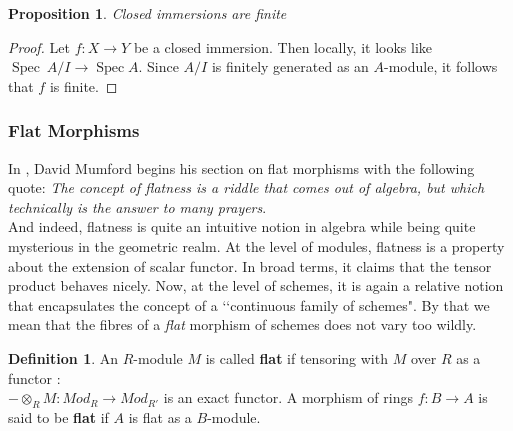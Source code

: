 \documentclass{article}
\theoremstyle{plain}
\newtheorem{proposition}[theorem]{Proposition}
\theoremstyle{definition}
\newtheorem{definition}[theorem]{Definition}
\DeclareMathOperator{\Spec}{Spec}
\begin{document}
\begin{proposition}
\label{closed_is_finite}
    Closed immersions are finite 
\end{proposition}
\begin{proof}
    Let $f:X\rightarrow Y$ be a closed immersion. 
    Then locally, it looks like $\Spec\: A/I \rightarrow \Spec A$. 
    Since $A/I$ is finitely generated as an $A$-module, it follows that $f$ is finite.
\end{proof}



\subsubsection{Flat Morphisms}


In \cite{Red_Book}, David Mumford begins his section on flat morphisms with the following quote:
\textit{The concept of flatness is a riddle that comes out of algebra, but which
technically is the answer to many prayers}.\\
And indeed, flatness is quite an intuitive notion in algebra while being quite mysterious in the geometric realm.
At the level of modules, flatness is a property about the extension of scalar functor. In broad terms, it claims that the tensor product behaves nicely.
Now, at the level of schemes, it is again a relative notion that encapsulates the concept of a ‘‘continuous family of schemes". 
By that we mean that the fibres of a \textit{flat} morphism of  schemes does not vary too wildly.

\begin{definition}
    An $R$-module $M$ is called \textbf{flat} if tensoring with $M$ over $R$ as a functor :\\
    $-\otimes_RM:Mod_R\rightarrow Mod_{R'}$ is an exact functor. 
    A morphism of rings $f: B \rightarrow A$ is said to be \textbf{flat} if $A$ is flat as a $B$-module.
    

\end{definition}
\end{document}
